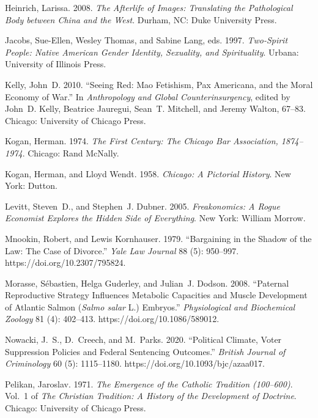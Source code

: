 \documentclass[]{interact}
\theoremstyle{plain}%
\theoremstyle{definition}
\theoremstyle{remark}
\begin{document}
\begin{thebibliography}{}
Heinrich, Larissa. 2008. \emph{The Afterlife of Images: Translating the
	Pathological Body between {C}hina and the {W}est}. Durham, NC: Duke
University Press.

Jacobs, Sue-Ellen, Wesley Thomas, and Sabine Lang, eds. 1997. \emph{Two-Spirit
	People: {N}ative {A}merican Gender Identity, Sexuality, and Spirituality}.
Urbana: University of Illinois Press.

Kelly, John~D. 2010. ``Seeing Red: {M}ao Fetishism, {P}ax {A}mericana, and the
Moral Economy of War.'' In \emph{Anthropology and Global Counterinsurgency},
edited by John~D. Kelly, Beatrice Jauregui, Sean~T. Mitchell, and Jeremy
Walton, 67--83. Chicago: University of Chicago Press.

Kogan, Herman. 1974. \emph{The First Century: The {C}hicago {B}ar
	{A}ssociation, 1874--1974}. Chicago: Rand McNally.

Kogan, Herman, and Lloyd Wendt. 1958. \emph{Chicago: A Pictorial History}. New
York: Dutton.

Levitt, Steven~D., and Stephen~J. Dubner. 2005. \emph{Freakonomics: A Rogue
	Economist Explores the Hidden Side of Everything}. New York: William Morrow.

Mnookin, Robert, and Lewis Kornhauser. 1979. ``Bargaining in the Shadow of the
Law: The Case of Divorce.'' \emph{Yale Law Journal} 88 (5): 950--997.
https://doi.org/{10.2307/795824}.

Morasse, S{\'e}bastien, Helga Guderley, and Julian~J. Dodson. 2008. ``Paternal
Reproductive Strategy Influences Metabolic Capacities and Muscle Development
of {A}tlantic Salmon (\emph{Salmo salar} L.) Embryos.'' \emph{Physiological
	and Biochemical Zoology} 81 (4): 402--413. https://doi.org/{10.1086/589012}.

Nowacki, J.~S., D.~Creech, and M.~Parks. 2020. ``Political Climate, Voter
Suppression Policies and Federal Sentencing Outcomes.'' \emph{British Journal
	of Criminology} 60 (5): 1115--1180. https://doi.org/{10.1093/bjc/azaa017}.

Pelikan, Jaroslav. 1971. \emph{The Emergence of the Catholic Tradition
	(100--600)}. Vol.~1 of \emph{The {C}hristian Tradition: A History of the
	Development of Doctrine}. Chicago: University of Chicago Press.


\end{thebibliography}
\end{document}
